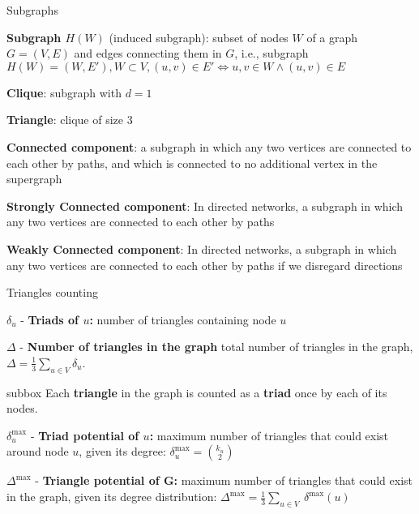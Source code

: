 \begin{textbox}{Subgraphs}

    \textbf{Subgraph $H(W)$} (induced subgraph): subset of nodes $W$ of a graph $G=(V,E)$ and edges connecting them in $G$, i.e., subgraph $H(W)=(W,E'), W \subset V, (u,v) \in E' \iff u,v \in W \wedge (u,v) \in E$

    \textbf{Clique}: subgraph with $d=1$

    \textbf{Triangle}: clique of size 3

    \textbf{Connected component}: a subgraph in which any two vertices are connected to each other by paths, and which is connected to no additional vertex in the supergraph

    \textbf{Strongly Connected component}: In directed networks, a subgraph in which any two vertices are connected to each other by paths

    \textbf{Weakly Connected component}: In directed networks, a subgraph in which any two vertices are connected to each other by paths if we disregard directions

\end{textbox}

\begin{textbox}{Triangles counting}

    $\delta_u$ - \textbf{Triads of $u$:} number of triangles containing node $u$

    $\Delta$ - \textbf{Number of triangles in the graph} total number of triangles in the graph, $\Delta=\frac{1}{3}\sum_{u\in V}\delta_u$.

    \begin{subbox}{subbox}{}
        \tiny{Each \textbf{triangle} in the graph is counted as a \textbf{triad} once by each of its nodes. }
    \end{subbox}

    $\delta^{\max}_u$ - \textbf{Triad potential of $u$:} maximum number of triangles that could exist around node $u$, given its degree: $\delta^{\max}_u=\binom {k_{u}}{2}$

    $\Delta^{\max}$ - \textbf{Triangle potential of G:} maximum number of triangles that could exist in the graph, given its degree distribution: $\Delta^{\max}=\frac {1}{3}\sum_{u\in V}\ \delta^{\max} (u)$


\end{textbox}


